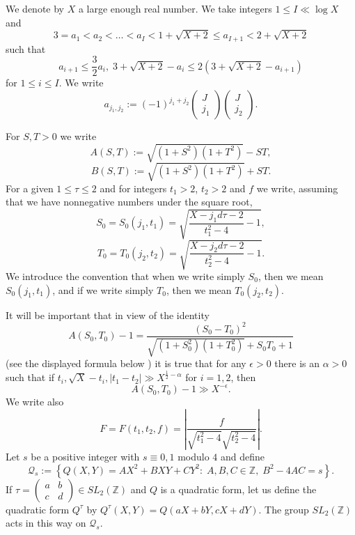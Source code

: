 \documentclass[12pt]{amsart}
\theoremstyle{definition}
\numberwithin{equation}{section}
\begin{document}
We denote by $X$ a large enough real number. We take integers $1\le
I\ll\log X$ and
$$3=a_1<a_2<\ldots <a_I<1+\sqrt {X+2}\le a_{I+1}<2+\sqrt {X+2}$$
such that
\[a_{i+1}\le\frac 32a_i,\;3+\sqrt {X+2}-a_i\le 2\left(3+\sqrt {X+
2}-a_{i+1}\right)
\]
for $1\le i\le I$.
We write
\begin{equation}a_{j_1,j_2}:=\left(-1\right)^{j_1+j_2}\left(\begin{array}{c}
J\\
j_1\end{array}
\right)\left(\begin{array}{c}
J\\
j_2\end{array}
\right).\label{888}\end{equation}

For $S,T>0$ we write
$$A\left(S,T\right):=\sqrt {\left(1+S^2\right)\left(1+T^2\right
)}-ST,$$
\[B\left(S,T\right):=\sqrt {\left(1+S^2\right)\left(1+T^2\right)}
+ST.\]
For a given $1\le\tau\le 2$ and for integers $t_1>2$, $t_2>2$ and $
f$ we write, assuming that we have nonnegative numbers under the square root,
\[S_0=S_0\left(j_1,t_1\right)=\sqrt {\frac {X-j_1d\tau -2}{t_1^2-
4}-1},\]
\[T_0=T_0\left(j_2,t_2\right)=\sqrt {\frac {X-j_2d\tau -2}{t_2^2-
4}-1}.\]
We introduce the convention that when we write simply $S_0$, then we mean
$S_0\left(j_1,t_1\right)$, and if we write simply $T_0$, then we mean $
T_0\left(j_2,t_2\right)$.

It will be important that in view of the identity
\[A\left(S_0,T_0\right)-1=\frac {\left(S_0-T_0\right)^2}{\sqrt {\left
(1+S_0^2\right)\left(1+T_0^2\right)}+S_0T_0+1}\]
(see the displayed formula below \cite[(6.49)]{Biro}) it is
true that for any $\epsilon >0$ there is an $\alpha >0$ such that if $
t_i,\sqrt X-t_i,\left|t_1-t_2\right|\gg X^{\frac 12-\alpha}$ for $
i=1,2$, then
\begin{equation}A\left(S_0,T_0\right)-1\gg X^{-\epsilon}.\label{741}\end{equation}
We write also
\begin{equation}F=F\left(t_1,t_2,f\right)=\left|\frac f{\sqrt {t_
1^2-4}\sqrt {t_2^2-4}}\right|.\label{742}\end{equation}
Let $s$ be a positive integer with $s\equiv 0,1$
modulo $4$ and define
$$\mathcal{Q}_s:=\left\{Q\left(X,Y\right)=AX^2+BXY+CY^2:\;A,B,C\in {\mathbb Z},\;
B^2-4AC=s\right\}.$$
If $\tau =\begin{pmatrix}a&b\\ c&d\end{pmatrix}\in SL_2({\mathbb Z})$ and $Q$ is a quadratic form, let us
define the quadratic form $Q^{\tau}$ by $Q^{\tau}\left(X,Y\right)
=Q\left(aX+bY,cX+dY\right)$. The
group $SL_2({\mathbb Z})$ acts in this way on $\mathcal{Q}_s$.
\end{document}
